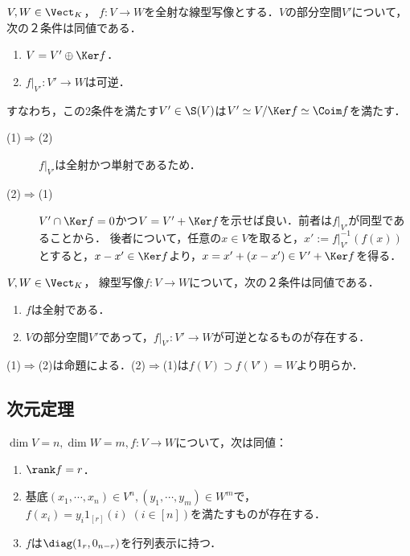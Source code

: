 \documentclass[uplatex, dvipdfmx]{jsreport}
\begin{document}
\begin{proposition}\label{prop-pre-homomorphism-thm}
    $V,W\in\Vect_K$，
    $f:V\to W$を全射な線型写像とする．$V$の部分空間$V'$について，次の２条件は同値である．
    \begin{enumerate}
        \item $V=V'\oplus\Ker f$．
        \item $f|_{V'}:V'\to W$は可逆．
    \end{enumerate}
    すなわち，この2条件を満たす$V'\in\S(V)$は$V'\simeq V/\Ker f\simeq\Coim f$を満たす．
\end{proposition}
\begin{Proof}\mbox{}
    \begin{description}
        \item[(1)$\Rightarrow$(2)] $f|_{V'}$は全射かつ単射であるため．
        \item[(2)$\Rightarrow$(1)] $V'\cap\Ker f=0$かつ$V=V'+\Ker f$を示せば良い．前者は$f|_{V'}$が同型であることから．
        後者について，任意の$x\in V$を取ると，$x':=f|_{V'}^{-1}(f(x))$とすると，$x-x'\in\Ker f$より，$x=x'+(x-x')\in V'+\Ker f$を得る．
    \end{description}
\end{Proof}

\begin{corollary}[全射の特徴付け]
    $V,W\in\Vect_K$，
    線型写像$f:V\to W$について，次の２条件は同値である．
    \begin{enumerate}
        \item $f$は全射である．
        \item $V$の部分空間$V'$であって，$f|_{V'}:V'\to W$が可逆となるものが存在する．
    \end{enumerate}
\end{corollary}
\begin{Proof}
    (1)$\Rightarrow$(2)は命題による．(2)$\Rightarrow$(1)は$f(V)\supset f(V')=W$より明らか．
\end{Proof}

\subsection{次元定理}

\begin{proposition}[線型写像の階数]
    $\dim V=n,\dim W=m,f:V\to W$について，次は同値：
    \begin{enumerate}
        \item $\rank f=r$．
        \item 基底$(x_1,\cdots,x_n)\in V^n,(y_1,\cdots,y_m)\in W^m$で，$f(x_i)=y_i1_{[r]}(i)\;(i\in[n])$を満たすものが存在する．
        \item $f$は$\diag(1_r,0_{n-r})$を行列表示に持つ．
    \end{enumerate}
\end{proposition}
\end{document}
